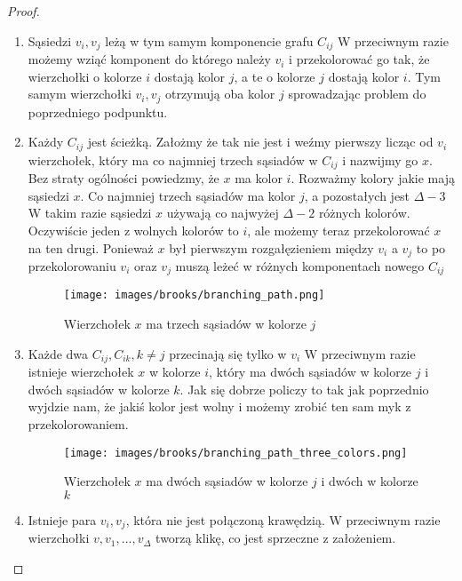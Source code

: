 \begin{proof}
\begin{enumerate}
		\item Sąsiedzi \(v_i, v_j\) leżą w tym samym komponencie grafu \(C_{ij}\)
		      W przeciwnym razie możemy wziąć komponent do którego należy \(v_i\)
		      i przekolorować go tak, że wierzchołki o kolorze \(i\) dostają kolor \(j\),
		      a te o kolorze \(j\) dostają kolor \(i\). Tym samym wierzchołki \(v_i, v_j\)
		      otrzymują oba kolor \(j\) sprowadzając problem do poprzedniego podpunktu.

		\item Każdy \(C_{ij}\) jest ścieżką.
		      Założmy że tak nie jest i weźmy pierwszy licząc od \(v_i\) wierzchołek, który ma co najmniej trzech sąsiadów w \(C_{ij}\) i nazwijmy go \(x\).
		      Bez straty ogólności powiedzmy, że \(x\) ma kolor \(i\).
		      Rozważmy kolory jakie mają sąsiedzi \(x\).
		      Co najmniej trzech sąsiadów ma kolor \(j\), a pozostałych jest \(\Delta - 3\)
		      W takim razie sąsiedzi \(x\) używają co najwyżej \(\Delta - 2\) różnych kolorów. Oczywiście jeden z wolnych kolorów to \(i\), ale możemy teraz przekolorować \(x\) na ten drugi.
		      Ponieważ \(x\) był pierwszym rozgałęzieniem między \(v_i\) a \(v_j\)
		      to po przekolorowaniu \(v_i\) oraz \(v_j\) muszą leżeć w różnych komponentach nowego \(C_{ij}\)

		      \begin{figure}[ht]
			      \centering
			      \texttt{[image: images/brooks/branching\_path.png]}
			      \caption{Wierzchołek \(x\) ma trzech sąsiadów w kolorze \(j\)}
		      \end{figure}

		\item Każde dwa \(C_{ij}, C_{ik}, k \neq j\) przecinają się tylko w \(v_i\)
		      W przeciwnym razie istnieje wierzchołek \(x\) w kolorze \(i\),
		      który ma dwóch sąsiadów w kolorze \(j\) i dwóch sąsiadów w kolorze \(k\).
		      Jak się dobrze policzy to tak jak poprzednio wyjdzie nam, że jakiś kolor jest wolny i możemy zrobić ten sam myk z przekolorowaniem.

		      \begin{figure}[ht]
			      \centering
			      \texttt{[image: images/brooks/branching\_path\_three\_colors.png]}
			      \caption{Wierzchołek \(x\) ma dwóch sąsiadów w kolorze \(j\) i dwóch w kolorze \(k\)}
		      \end{figure}

		\item Istnieje para \(v_i, v_j\), która nie jest połączoną krawędzią.
		      W przeciwnym razie wierzchołki \(v, v_1, ..., v_\Delta\) tworzą klikę, co jest sprzeczne z założeniem.


\end{enumerate}
\end{proof}
